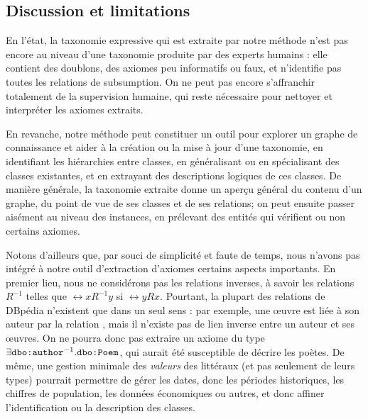 \subsection{Discussion et limitations}


En l'état, la taxonomie expressive qui est extraite par notre méthode n'est pas encore au niveau d'une taxonomie produite par des experts humains : elle contient des doublons, des axiomes peu informatifs ou faux, et n'identifie pas toutes les relations de subsumption. On ne peut pas encore s'affranchir totalement de la supervision humaine, qui reste nécessaire pour nettoyer et interpréter les axiomes extraits. 

En revanche, notre méthode peut constituer un outil pour explorer un graphe de connaissance et aider à la création ou la mise à jour d'une taxonomie, en identifiant les hiérarchies entre classes, en généralisant ou en spécialisant des classes existantes, et en extrayant des descriptions logiques de ces classes. 
De manière générale, la taxonomie extraite donne un aperçu général du contenu d'un graphe, du point de vue de ses classes et de ses relations; on peut ensuite passer aisément au niveau des instances, en prélevant des entités qui vérifient ou non certains axiomes.

Notons d'ailleurs que, par souci de simplicité et faute de temps, nous n'avons pas intégré à notre outil d'extraction d'axiomes certains aspects importants.
En premier lieu, nous ne considérons pas les relations inverses, à savoir les relations $R^{-1}$ telles que $\rel{x}{R^{-1}}{y}$ si $\rel{y}{R}{x}$. 
Pourtant, la plupart des relations de DBpédia n'existent que dans un seul sens : par exemple, une œuvre est liée à son auteur par la relation , mais il n'existe pas de lien inverse entre un auteur et ses œuvres. On ne pourra donc pas extraire un axiome du type $\exists \texttt{dbo:author}^{-1}. \allowbreak \texttt{dbo:Poem}$, qui aurait été susceptible de décrire les poètes. De même, une gestion minimale des \textit{valeurs} des littéraux (et pas seulement de leurs types) pourrait permettre de gérer les dates, donc les périodes historiques, les chiffres de population, les données économiques ou autres, et donc affiner l'identification ou la description des classes.
